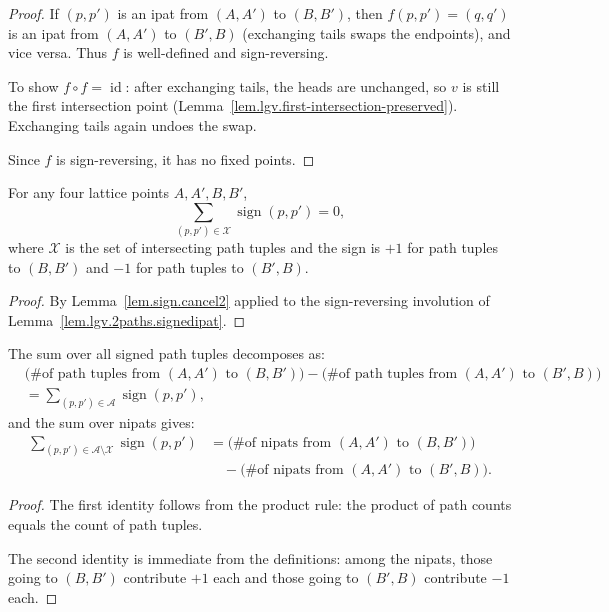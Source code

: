 \begin{proof}
If $(p, p')$ is an ipat from $(A, A')$ to $(B, B')$, then
$f(p, p') = (q, q')$ is an ipat from $(A, A')$ to $(B', B)$
(exchanging tails swaps the endpoints), and vice versa.
Thus $f$ is well-defined and sign-reversing.

To show $f \circ f = \operatorname{id}$: after exchanging tails, the
heads are unchanged, so $v$ is still the first intersection point
(Lemma~\ref{lem.lgv.first-intersection-preserved}).
Exchanging tails again undoes the swap.

Since $f$ is sign-reversing, it has no fixed points.
\end{proof}

\begin{lemma}
\label{lem.lgv.2paths.ipatcancel}
\leanhelper
\leanok
For any four lattice points $A, A', B, B'$,
\[
  \sum_{(p,p') \in \mathcal{X}} \operatorname{sign}(p, p') = 0,
\]
where $\mathcal{X}$ is the set of intersecting path tuples and the sign
is $+1$ for path tuples to $(B, B')$ and $-1$ for path tuples to
$(B', B)$.
\end{lemma}

\begin{proof}
By Lemma~\ref{lem.sign.cancel2} applied to the sign-reversing
involution of Lemma~\ref{lem.lgv.2paths.signedipat}.
\end{proof}

\begin{lemma}
\label{lem.lgv.2paths.partition}
\leanhelper
\leanok
The sum over all signed path tuples decomposes as:
\begin{align*}
  &\bigl(\text{\# of path tuples from } (A,A') \text{ to }
   (B,B')\bigr)
   - \bigl(\text{\# of path tuples from } (A,A') \text{ to }
   (B',B)\bigr) \\
  &= \sum_{(p,p') \in \mathcal{A}} \operatorname{sign}(p,p'),
\end{align*}
and the sum over nipats gives:
\begin{align*}
  \sum_{(p,p') \in \mathcal{A} \setminus \mathcal{X}}
    \operatorname{sign}(p,p')
  &= \bigl(\text{\# of nipats from } (A,A') \text{ to } (B,B')\bigr) \\
  &\quad - \bigl(\text{\# of nipats from } (A,A') \text{ to } (B',B)\bigr).
\end{align*}
\end{lemma}

\begin{proof}
The first identity follows from the product rule: the product of path
counts equals the count of path tuples.

The second identity is immediate from the definitions: among the nipats,
those going to $(B,B')$ contribute $+1$ each and those going to
$(B',B)$ contribute $-1$ each.
\end{proof}


